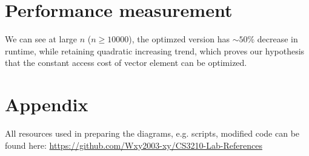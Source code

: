 \documentclass[a4paper]{article}
\begin{document}
\section{Performance measurement}
\par\vspace{-1.5em}
\par\vspace{3ex}
\begin{minipage}{0.45\linewidth}
    \noindent{}
    \end{minipage}\hfill
    \begin{minipage}{0.5\linewidth}
        We can see at large $n$ ($n \geq 10000$), the optimzed version has $\sim 50\%$ decrease in runtime, while retaining quadratic increasing trend,
        which proves our hypothesis that the constant access cost of vector element can be optimized.
    \end{minipage}\hfill
    \par\vspace{3ex}

\section{Appendix}
All resources used in preparing the diagrams, e.g. scripts, modified code can be found here: 
\href{https://github.com/Wxy2003-xy/CS3210-Lab-References}{https://github.com/Wxy2003-xy/CS3210-Lab-References}
\end{document}
